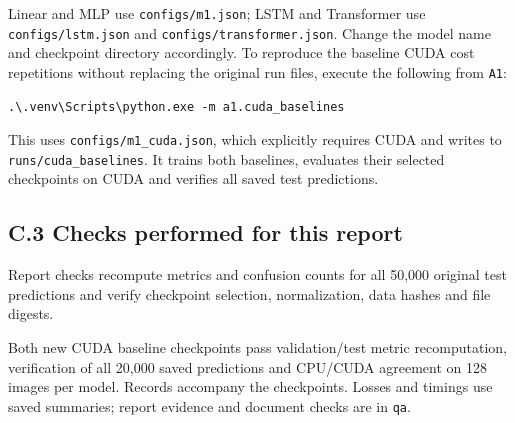 Linear and MLP use \texttt{configs/m1.json}; LSTM and Transformer use
\texttt{configs/lstm.json} and \texttt{configs/transformer.json}.
Change the model name and checkpoint directory accordingly.
To reproduce the baseline CUDA cost repetitions without replacing the original
run files, execute the following from \texttt{A1}:
\begin{verbatim}
.\.venv\Scripts\python.exe -m a1.cuda_baselines
\end{verbatim}
This uses \texttt{configs/m1\_cuda.json}, which explicitly requires CUDA and
writes to \texttt{runs/cuda\_baselines}. It trains both baselines, evaluates
their selected checkpoints on CUDA and verifies all saved test predictions.

\subsection{C.3 Checks performed for this report}
Report checks recompute metrics and confusion counts for all 50,000 original
test predictions and verify checkpoint selection, normalization, data hashes
and file digests.

Both new CUDA baseline checkpoints pass validation/test metric recomputation,
verification of all 20,000 saved predictions and CPU/CUDA agreement on 128
images per model. Records accompany the checkpoints. Losses and timings use
saved summaries; report evidence and document checks are in \texttt{qa}.

